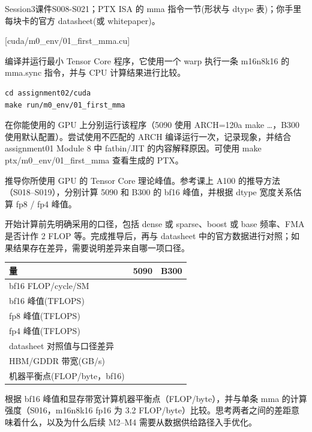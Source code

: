 \documentclass[11pt,a4paper,fontset=none]{ctexart}
\begin{document}
\begin{reading}

Session3课件S008-S021；PTX ISA 的 mma 指令一节(形状与 dtype 表)；你手里
每块卡的官方 datasheet(或 whitepaper)。

\end{reading}

[cuda/m0\_env/01\_first\_mma.cu]

编译并运行最小 Tensor Core 程序，它使用一个 warp 执行一条 m16n8k16 的
mma.sync 指令，并与 CPU 计算结果进行比较。

\begin{lstlisting}
cd assignment02/cuda
make run/m0_env/01_first_mma
\end{lstlisting}

在你能使用的 GPU 上分别运行该程序（5090 使用 ARCH=120a make \ldots，B300
使用默认配置）。尝试使用不匹配的 ARCH 编译运行一次，记录现象，并结合
assignment01 Module 8 中 fatbin/JIT 的内容解释原因。可使用 make
ptx/m0\_env/01\_first\_mma 查看生成的 PTX。


推导你所使用 GPU 的 Tensor Core 理论峰值。参考课上 A100
的推导方法（S018--S019），分别计算 5090 和 B300 的 bf16 峰值，并根据
dtype 宽度关系估算 fp8 / fp4 峰值。

开始计算前先明确采用的口径，包括 dense 或 sparse、boost 或 base
频率、FMA 是否计作 2 FLOP 等。完成推导后，再与 datasheet
中的官方数据进行对照；如果结果存在差异，需要说明差异来自哪一项口径。

{\def\LTcaptype{none} %
\begin{longtable}[]{@{}lll@{}}
\toprule\noalign{}
量 & 5090 & B300 \\
\midrule\noalign{}
\endhead
\bottomrule\noalign{}
\endlastfoot
bf16 FLOP/cycle/SM & & \\
bf16 峰值(TFLOPS) & & \\
fp8 峰值(TFLOPS) & & \\
fp4 峰值(TFLOPS) & & \\
datasheet 对照值与口径差异 & & \\
HBM/GDDR 带宽(GB/s) & & \\
机器平衡点(FLOP/byte，bf16) & & \\
\end{longtable}
}

根据 bf16 峰值和显存带宽计算机器平衡点（FLOP/byte），并与单条 mma
的计算强度（S016，m16n8k16 fp16 为 3.2
FLOP/byte）比较。思考两者之间的差距意味着什么，以及为什么后续 M2--M4
需要从数据供给路径入手优化。
\end{document}
